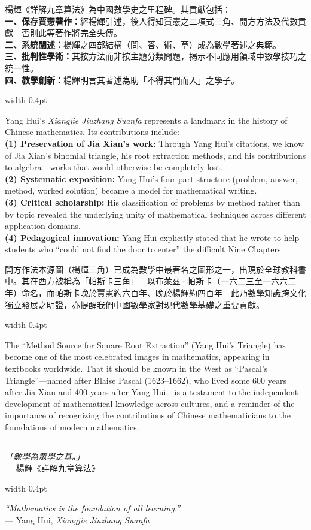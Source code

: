 \documentclass[10pt,a4paper]{article}
\newcommand{\longline}{\noindent\rule{\textwidth}{0.4pt}}
\newcommand{\zh}[1]{{\CJKfamily{notocjksc}#1}}
\newcommand{\bilingual}[2]{%
  \par\smallskip\noindent%
  \begin{minipage}[t]{0.47\textwidth}%
    \RaggedRight\small #1%
  \end{minipage}%
  \hfill\vrule width 0.4pt\hfill%
  \begin{minipage}[t]{0.47\textwidth}%
    \RaggedRight\small #2%
  \end{minipage}%
  \par\smallskip%
}
\begin{document}
\bilingual{
  楊輝《詳解九章算法》為中國數學史之里程碑。其貢獻包括：\\
  \textbf{一、保存賈憲著作：}經楊輝引述，後人得知賈憲之二項式三角、開方方法及代數貢獻---否則此等著作將完全失傳。\\
  \textbf{二、系統闡述：}楊輝之四部結構（問、答、術、草）成為數學著述之典範。\\
  \textbf{三、批判性學術：}其按方法而非按主題分類問題，揭示不同應用領域中數學技巧之統一性。\\
  \textbf{四、教學創新：}楊輝明言其著述為助「不得其門而入」之學子。
}{%
  Yang Hui's \textit{Xiangjie Jiuzhang Suanfa} represents a landmark in the history of Chinese mathematics. Its contributions include:\\
  \textbf{(1) Preservation of Jia Xian's work:} Through Yang Hui's citations, we know of Jia Xian's binomial triangle, his root extraction methods, and his contributions to algebra---works that would otherwise be completely lost.\\
  \textbf{(2) Systematic exposition:} Yang Hui's four-part structure (problem, answer, method, worked solution) became a model for mathematical writing.\\
  \textbf{(3) Critical scholarship:} His classification of problems by method rather than by topic revealed the underlying unity of mathematical techniques across different application domains.\\
  \textbf{(4) Pedagogical innovation:} Yang Hui explicitly stated that he wrote to help students who ``could not find the door to enter'' the difficult Nine Chapters.
}

\vspace{1em}

\bilingual{
  \zh{開方作法本源圖}（楊輝三角）已成為數學中最著名之圖形之一，出現於全球教科書中。其在西方被稱為「帕斯卡三角」---以布萊茲·帕斯卡（一六二三至一六六二年）命名，而帕斯卡晚於賈憲約六百年、晚於楊輝約四百年---此乃數學知識跨文化獨立發展之明證，亦提醒我們中國數學家對現代數學基礎之重要貢獻。
}{%
  The ``Method Source for Square Root Extraction'' (Yang Hui's Triangle) has become one of the most celebrated images in mathematics, appearing in textbooks worldwide. That it should be known in the West as ``Pascal's Triangle''---named after Blaise Pascal (1623--1662), who lived some 600 years after Jia Xian and 400 years after Yang Hui---is a testament to the independent development of mathematical knowledge across cultures, and a reminder of the importance of recognizing the contributions of Chinese mathematicians to the foundations of modern mathematics.
}

\vspace{2em}

\begin{center}
\longline
\end{center}

\vspace{1em}

\begin{center}
\bilingual{
  \textit{\zh{「數學為眾學之基。」}}\\
  --- \zh{楊輝《詳解九章算法》}
}{%
  \textit{``Mathematics is the foundation of all learning.''}\\
  --- Yang Hui, \textit{Xiangjie Jiuzhang Suanfa}
}
\end{center}
\end{document}
